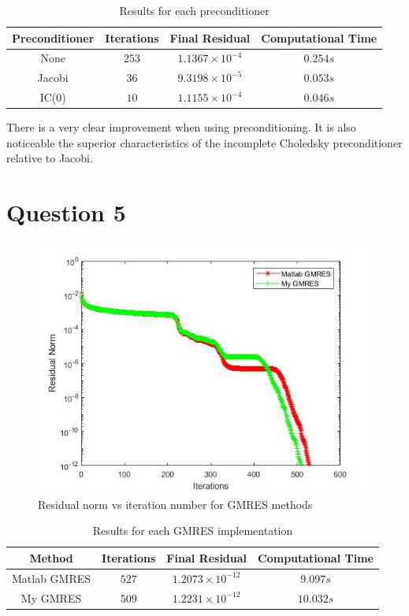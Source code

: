 \documentclass[a4paper, 11pt]{article}
\begin{document}
			\begin{table}[H]
			\centering
			\begin{tabular}{c|c|c|c}
				\textbf{Preconditioner} &  \textbf{Iterations} 	& \textbf{Final Residual} 		& \textbf{Computational Time} 	\\ \hline
				None					& 			$253$ 		& $ 1.1367 \times 10^{-4} $ 	& $ 0.254 s $	\\ \hline
				Jacobi					& 			$36$ 		& $ 9.3198 \times 10^{-5} $ 	& $ 0.053 s $	\\ \hline		
				IC(0)					& 			$10$		& $ 1.1155 \times 10^{-4} $		& $	0.046 s $	\\
			\end{tabular}
			\caption{Results for each preconditioner}
			\label{table:ex4}
			\end{table}
		
			There is a very clear improvement when using preconditioning.
			It is also noticeable the superior characteristics of the incomplete Choledsky preconditioner relative to Jacobi.
		
		\section*{Question 5}
			\begin{figure}[H]
				\centering
				\includegraphics[width=.6\linewidth]{ex5.jpg}
				\caption{Residual norm vs iteration number for GMRES methods}
				\label{fig:ex5}
			\end{figure}
		
			\begin{table}[H]
				\centering
				\begin{tabular}{c|c|c|c}
					\textbf{Method} &  \textbf{Iterations} 	& \textbf{Final Residual} 		& \textbf{Computational Time} 	\\ \hline
					Matlab GMRES	& 			$527$ 		& $ 1.2073 \times 10^{-12} $ 	& $ 9.097 s $	\\ \hline
					My GMRES		& 			$509$ 		& $ 1.2231 \times 10^{-12} $ 	& $ 10.032 s $	\\ 
				\end{tabular}
				\caption{Results for each GMRES implementation}
				\label{table:ex5}
			\end{table}
			
\end{document}
